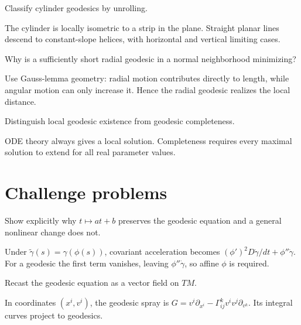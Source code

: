 \begin{problem}\label{prob:vii23-10}
Classify cylinder geodesics by unrolling.
\end{problem}
\begin{solution}
The cylinder is locally isometric to a strip in the plane. Straight planar lines descend to constant-slope helices, with horizontal and vertical limiting cases.
\end{solution}


\begin{problem}\label{prob:vii23-11}
Why is a sufficiently short radial geodesic in a normal neighborhood minimizing?
\end{problem}
\begin{solution}
Use Gauss-lemma geometry: radial motion contributes directly to length, while angular motion can only increase it. Hence the radial geodesic realizes the local distance.
\end{solution}


\begin{problem}\label{prob:vii23-12}
Distinguish local geodesic existence from geodesic completeness.
\end{problem}
\begin{solution}
ODE theory always gives a local solution. Completeness requires every maximal solution to extend for all real parameter values.
\end{solution}

\section{Challenge problems}

\begin{problem}\label{prob:vii23-ch01}
Show explicitly why \(t\mapsto at+b\) preserves the geodesic equation and a general nonlinear change does not.
\end{problem}
\begin{solution}
Under \(\widetilde\gamma(s)=\gamma(\phi(s))\), covariant acceleration becomes \((\phi')^2D\dot\gamma/dt+\phi''\dot\gamma\). For a geodesic the first term vanishes, leaving \(\phi''\dot\gamma\), so affine \(\phi\) is required.
\end{solution}


\begin{problem}\label{prob:vii23-ch02}
Recast the geodesic equation as a vector field on \(TM\).
\end{problem}
\begin{solution}
In coordinates \((x^i,v^i)\), the geodesic spray is \(G=v^i\partial_{x^i}-\Gamma^k_{ij}v^iv^j\partial_{v^k}\). Its integral curves project to geodesics.
\end{solution}


